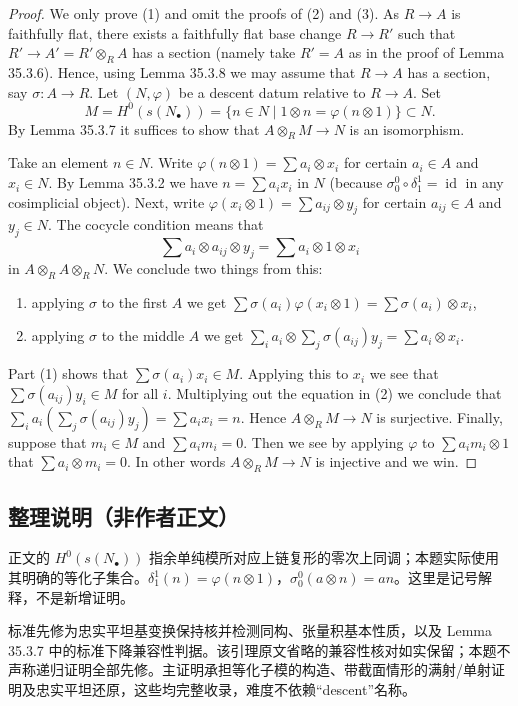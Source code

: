 \documentclass[UTF8,11pt]{ctexart}
\theoremstyle{definition}
\DeclareMathOperator{\id}{id}
\begin{document}
\begin{proof}
We only prove (1) and omit the proofs of (2) and (3). As $R\to A$ is faithfully flat, there exists a faithfully flat base change $R\to R'$ such that $R'\to A'=R'\otimes_R A$ has a section (namely take $R'=A$ as in the proof of Lemma 35.3.6). Hence, using Lemma 35.3.8 we may assume that $R\to A$ has a section, say $\sigma:A\to R$. Let $(N,\varphi)$ be a descent datum relative to $R\to A$. Set
\[
M=H^0(s(N_\bullet))=\{n\in N\mid1\otimes n=\varphi(n\otimes1)\}\subset N.
\]
By Lemma 35.3.7 it suffices to show that $A\otimes_R M\to N$ is an isomorphism.

Take an element $n\in N$. Write $\varphi(n\otimes1)=\sum a_i\otimes x_i$ for certain $a_i\in A$ and $x_i\in N$. By Lemma 35.3.2 we have $n=\sum a_i x_i$ in $N$ (because $\sigma^0_0\circ\delta^1_1=\id$ in any cosimplicial object). Next, write $\varphi(x_i\otimes1)=\sum a_{ij}\otimes y_j$ for certain $a_{ij}\in A$ and $y_j\in N$. The cocycle condition means that
\[
\sum a_i\otimes a_{ij}\otimes y_j=\sum a_i\otimes1\otimes x_i
\]
in $A\otimes_R A\otimes_R N$. We conclude two things from this:
\begin{enumerate}
\item applying $\sigma$ to the first $A$ we get $\sum\sigma(a_i)\varphi(x_i\otimes1)=\sum\sigma(a_i)\otimes x_i$,
\item applying $\sigma$ to the middle $A$ we get $\sum_i a_i\otimes\sum_j\sigma(a_{ij})y_j=\sum a_i\otimes x_i$.
\end{enumerate}
Part (1) shows that $\sum\sigma(a_i)x_i\in M$. Applying this to $x_i$ we see that $\sum\sigma(a_{ij})y_i\in M$ for all $i$. Multiplying out the equation in (2) we conclude that $\sum_i a_i(\sum_j\sigma(a_{ij})y_j)=\sum a_i x_i=n$. Hence $A\otimes_R M\to N$ is surjective. Finally, suppose that $m_i\in M$ and $\sum a_i m_i=0$. Then we see by applying $\varphi$ to $\sum a_i m_i\otimes1$ that $\sum a_i\otimes m_i=0$. In other words $A\otimes_R M\to N$ is injective and we win.
\end{proof}

\subsection*{整理说明（非作者正文）}
正文的 $H^0(s(N_\bullet))$ 指余单纯模所对应上链复形的零次上同调；本题实际使用其明确的等化子集合。\(\delta^1_1(n)=\varphi(n\otimes1)\)，\(\sigma^0_0(a\otimes n)=an\)。这里是记号解释，不是新增证明。

标准先修为忠实平坦基变换保持核并检测同构、张量积基本性质，以及 Lemma 35.3.7 中的标准下降兼容性判据。该引理原文省略的兼容性核对如实保留；本题不声称递归证明全部先修。主证明承担等化子模的构造、带截面情形的满射/单射证明及忠实平坦还原，这些均完整收录，难度不依赖“descent”名称。
\end{document}

